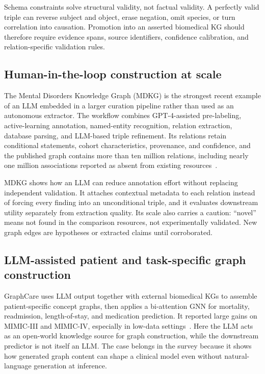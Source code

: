 Schema constraints solve structural validity, not factual validity. A perfectly valid triple can reverse subject and object, erase negation, omit species, or turn correlation into causation. Promotion into an asserted biomedical KG should therefore require evidence spans, source identifiers, confidence calibration, and relation-specific validation rules.

\subsection{Human-in-the-loop construction at scale}

The Mental Disorders Knowledge Graph (MDKG) is the strongest recent example of an LLM embedded in a larger curation pipeline rather than used as an autonomous extractor. The workflow combines GPT-4-assisted pre-labeling, active-learning annotation, named-entity recognition, relation extraction, database parsing, and LLM-based triple refinement. Its relations retain conditional statements, cohort characteristics, provenance, and confidence, and the published graph contains more than ten million relations, including nearly one million associations reported as absent from existing resources~\cite{gao2025mdkg}.

MDKG shows how an LLM can reduce annotation effort without replacing independent validation. It attaches contextual metadata to each relation instead of forcing every finding into an unconditional triple, and it evaluates downstream utility separately from extraction quality. Its scale also carries a caution: ``novel'' means not found in the comparison resources, not experimentally validated. New graph edges are hypotheses or extracted claims until corroborated.

\subsection{LLM-assisted patient and task-specific graph construction}

GraphCare uses LLM output together with external biomedical KGs to assemble patient-specific concept graphs, then applies a bi-attention GNN for mortality, readmission, length-of-stay, and medication prediction. It reported large gains on MIMIC-III and MIMIC-IV, especially in low-data settings~\cite{jiang2024graphcare}. Here the LLM acts as an open-world knowledge source for graph construction, while the downstream predictor is not itself an LLM. The case belongs in the survey because it shows how generated graph content can shape a clinical model even without natural-language generation at inference.

